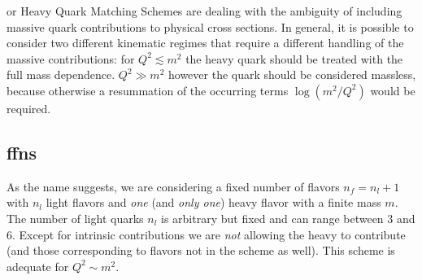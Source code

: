 
\fns or Heavy Quark Matching Schemes are dealing with the ambiguity of
including massive quark contributions to physical cross sections. 
%
In general, it is possible to consider two different kinematic regimes that
require a different handling of the massive contributions: for $Q^2 \lesssim
m^2$ the heavy quark should be treated with the full mass dependence. 
$Q^2 \gg m^2$ however the quark should be considered massless, because
otherwise a resummation of the occurring terms $\log(m^2/Q^2)$ would be
required.

\subsection[Fixed]{\acrlong{ffns}}
\label{sec:dis/ffns}

As the name \ffns suggests, we are considering a fixed number of flavors
$n_f=n_l+1$ with $n_l$ light flavors and \textit{one} (and \textit{only one})
heavy flavor\textit{} with a finite mass $m$.
The number of light quarks $n_l$ is arbitrary but fixed and can range between
$3$ and $6$. 
Except for intrinsic contributions we are \textit{not} allowing the heavy \pdf
to contribute (and those corresponding to flavors not in the scheme as well).
%
This scheme is adequate for $Q^2\sim m^2$.

